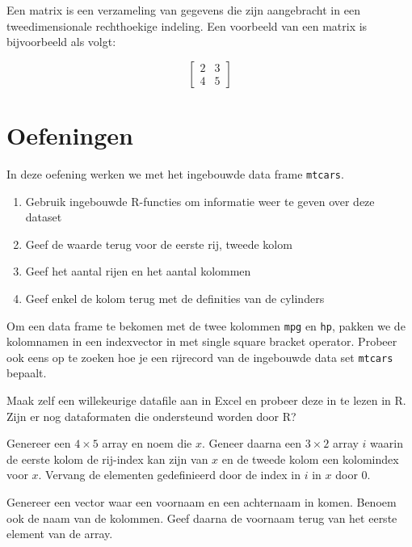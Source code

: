 Een matrix is een verzameling van gegevens die zijn aangebracht in een tweedimensionale rechthoekige indeling. Een voorbeeld van een matrix is bijvoorbeeld als volgt:

\[
\begin{bmatrix}
2 & 3 \\ 
4 & 5  
\end{bmatrix}
\]



\section{Oefeningen}

\begin{exercise}
    In deze oefening werken we met het ingebouwde data frame \texttt{mtcars}. 
    \begin{enumerate}
        \item   Gebruik ingebouwde R-functies om informatie weer te geven over deze dataset
        \item   Geef de waarde terug voor de eerste rij, tweede kolom
        \item   Geef het aantal rijen en het aantal kolommen
        \item   Geef enkel de kolom terug met de definities van de cylinders
    \end{enumerate}

    Om een data frame te bekomen met de twee kolommen \texttt{mpg} en \texttt{hp}, 
    pakken we de kolomnamen in een indexvector in met single square bracket operator. 
    Probeer ook eens op te zoeken hoe je een rijrecord van de ingebouwde data set \texttt{mtcars} bepaalt.
\end{exercise}

\begin{exercise}
  Maak zelf een willekeurige datafile aan in Excel en probeer deze in te lezen in R. Zijn er nog dataformaten die ondersteund worden door R?
\end{exercise}

\begin{exercise}
  Genereer een $4 \times 5$ array en noem die $x$. Geneer daarna een $3 \times 2$ array $i$ waarin de eerste kolom de rij-index kan zijn van $x$ en de tweede kolom een kolomindex voor $x$. Vervang de elementen gedefinieerd door de index in $i$ in $x$ door 0. 
\end{exercise}

\begin{exercise}
  Genereer een vector waar een voornaam en een achternaam in komen. Benoem ook de naam van de kolommen. Geef daarna de voornaam terug van het eerste element van de array. 
\end{exercise}

